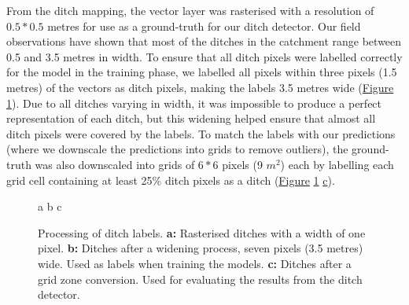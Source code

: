 \documentclass[11pt, review]{elsarticle} %
\begin{document}
From the ditch mapping, the vector layer was rasterised with a resolution of $0.5*0.5$ metres for use as a ground-truth for our ditch detector. Our field observations have shown that most of the ditches in the catchment range between 0.5 and 3.5 metres in width. To ensure that all ditch pixels were labelled correctly for the model in the training phase, we labelled all pixels within three pixels (1.5 metres) of the vectors as ditch pixels, making the labels 3.5 metres wide (\hyperref[fig:ditchpreprocess]{Figure} \ref{fig:ditchpreprocess}). Due to all ditches varying in width, it was impossible to produce a perfect representation of each ditch, but this widening helped ensure that almost all ditch pixels were covered by the labels. To match the labels with our predictions (where we downscale the predictions into grids to remove outliers), the ground-truth was also downscaled into grids of $6*6$ pixels (9 $m^2$) each by labelling each grid cell containing at least 25\% ditch pixels as a ditch (\hyperref[fig:ditchpreprocess]{Figure} \ref{fig:ditchpreprocess} \hyperref[fig:ditchpreprocess]{c}).

\begin{figure} [!htb]
    \centering
    a{
        }\hspace{5pt}
    b{
        }
    c{
        }
    \caption{Processing of ditch labels. \textbf{a: }Rasterised ditches with a width of one pixel. \textbf{b: }Ditches after a widening process, seven pixels (3.5 metres) wide. Used as labels when training the models. \textbf{c: }Ditches after a grid zone conversion. Used for evaluating the results from the ditch detector.} \label{sample-figure}
    \label{fig:ditchpreprocess}
\end{figure}
\end{document}
